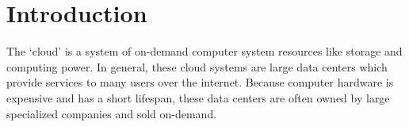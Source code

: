 \chapter{Introduction}

The `cloud' is a system of on-demand computer system resources like storage
and computing power. In general, these cloud systems are large data centers
which provide services to many users over the internet. Because computer
hardware is expensive and has a short lifespan, these data centers are often
owned by large specialized companies and sold on-demand.
